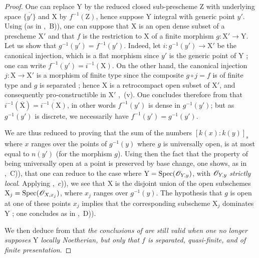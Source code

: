 \begin{proof}
One can replace $\mathrm{Y}$ by the reduced closed sub-prescheme $\mathrm{Z}$ with underlying space $\overline{\{y'\}}$ and $\mathrm{X}$ by $f^{-1}(\mathrm{Z})$, hence suppose $\mathrm{Y}$ integral with generic point $y'$.
Using  (as in ,~B)), one can suppose that $\mathrm{X}$ is an open dense subset of a prescheme $\mathrm{X}'$ and that $f$ is the restriction to $\mathrm{X}$ of a finite morphism $g:\mathrm{X}'\to\mathrm{Y}$.
Let us show that $g^{-1}(y')=f^{-1}(y')$.
Indeed, let $i:g^{-1}(y')\to\mathrm{X}'$ be the canonical injection, which is a flat morphism since $y'$ is the generic point of $\mathrm{Y}$ ; one can write $f^{-1}(y')=i^{-1}(\mathrm{X})$.
On the other hand, the canonical injection $j:\mathrm{X}\to\mathrm{X}'$ is a morphism of finite type since the composite $g\circ j=f$ is of finite type and $g$ is separated ; hence $\mathrm{X}$ is a retrocompact open subset of $\mathrm{X}'$, and consequently pro-constructible in $\mathrm{X}'$ ,~(v).
One concludes therefore from  that $i^{-1}(\overline{\mathrm{X}})=\overline{i^{-1}(\mathrm{X})}$, in other words $f^{-1}(y')$ is dense in $g^{-1}(y')$; but as $g^{-1}(y')$ is discrete, we necessarily have $f^{-1}(y')=g^{-1}(y')$.

We are thus reduced to proving that the sum of the numbers $[k(x):k(y)]_s$ where $x$ ranges over the points of $g^{-1}(y)$ where $g$ is universally open, is at most equal to
$n(y')$ (for the morphism $g$).
Using then the fact that the property of being universally open at a point is preserved by base change, one shows, as in ,~C)), that one can reduce to the case where $\mathrm{Y}=\operatorname{Spec}(\mathscr{O}_{Y,y})$, with $\mathscr{O}_{Y,y}$ \emph{strictly local}.
Applying ,~$c$)), we see that $\mathrm{X}$ is the disjoint union of the open subschemes $\mathrm{X}_j=\operatorname{Spec}(\mathscr{O}_{X,x_j})$, where $x_j$ ranges over $g^{-1}(y)$. The hypothesis that $g$ is open at one of these points $x_j$ implies that the corresponding subscheme $\mathrm{X}_j$ dominates $\mathrm{Y}$ ; one concludes as in ,~D)).

We then deduce from  that \emph{the conclusions of  are still valid when one no longer supposes $\mathrm{Y}$ locally Noetherian, but only that $f$ is separated, quasi-finite, and of finite presentation}.
\end{proof}

